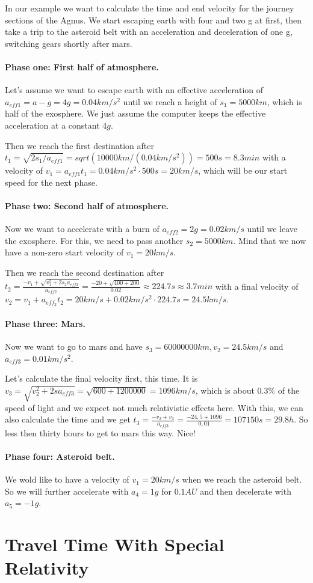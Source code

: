 \documentclass[10pt]{article}
\numberwithin{equation}{section}
\begin{document}
	In our example we want to calculate the time and end velocity for the journey sections of the Agnus. We start escaping earth with four and two g at first, then take a trip to the asteroid belt with an acceleration and deceleration of one g, switching gears shortly after mars.
	
	\paragraph{Phase one: First half of atmosphere.}
	Let's assume we want to escape earth with an effective acceleration of $a_{eff1} = a-g = 4g = 0.04 km/s^2$ until we reach a height of $s_1=5000 km$, which is half of the exosphere. We just assume the computer keeps the effective acceleration at a constant $4g$.
	
	Then we reach the first destination after $t_1 = \sqrt{2s_1/a_{eff1}} = sqrt(10000km/(0.04km/s^2)) = 500 s = 8.3 min$ with a velocity of $v_1=a_{eff1}t_1=0.04km/s^2\cdot 500s = 20 km/s$, which will be our start speed for the next phase.
	
	\paragraph{Phase two: Second half of atmosphere.}
	Now we want to accelerate with a burn of $a_{eff2}=2g=0.02km/s$ until we leave the exosphere. For this, we need to pass another $s_2=5000km$. Mind that we now have a non-zero start velocity of $v_1 = 20 km/s$.
	
	Then we reach the second destination after $t_2 = \frac{-v_1+\sqrt{v^2_1+2s_2a_{eff2}}}{a_{eff2}} =\frac{-20+\sqrt{400+200}}{0.02} \approx 224.7 s \approx 3.7 min $ with a final velocity of $v_2 = v_1 + a_{eff_2}t_2 = 20 km/s + 0.02 km/s^2\cdot 224.7 s = 24.5 km/s$.
	
	\paragraph{Phase three: Mars.}	
	Now we want to go to mars and have $s_3 = 60 000 000 km, v_2 = 24.5 km/s$ and $a_{eff3} = 0.01 km/s^2$.
	
	Let's calculate the final velocity first, this time. It is $v_3 = \sqrt{v^2_2 + 2sa_{eff3}} = \sqrt{600 + 1 200 000} = 1096 km/s$, which is about $0.3 \%$ of the speed of light and we expect not much relativistic effects here. With this, we can also calculate the time and we get $t_3 = \frac{-v_2 + v_3}{a_{eff3}} = \frac{-24,5 + 1096}{0,01} = 107150 s = 29.8 h$. So less then thirty hours to get to mars this way. Nice!
	
	\paragraph{Phase four: Asteroid belt.}
	
	We wold like to have a velocity of $v_1 = 20 km/s$ when we reach the asteroid belt. So we will further accelerate with $a_4 = 1 g$ for $0.1 AU$ and then decelerate with $a_5 = -1 g$.
	
	
	
	\section{Travel Time With Special Relativity}
\end{document}
